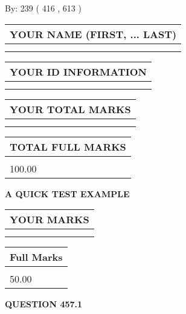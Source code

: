 \documentclass[12pt]{article}
\begin{document}
   
\hspace{1.0in} By: 
 239 ( 416 ,  613 )
   
   
   
   
\newpage 
\setcounter{page}{ 
   457001 } 
   
   
   
   
\noindent\begin{tabular}{|l|}
\hline
YOUR NAME (FIRST, ... LAST)  \\
\hline
 \\ 
 \\ 
\hline
\end{tabular}
\hspace{0.05in} \begin{tabular}{|l|}
\hline
 YOUR   ID   INFORMATION  \\
\hline
 \\ 
 \\ 
\hline
\end{tabular}
   
   
\vspace{0.2in}\noindent\begin{tabular}{|l|}
\hline
YOUR TOTAL MARKS  \\
\hline
 \\ 
 \\ 
\hline
\end{tabular}
\hspace{0.05in} \begin{tabular}{|l|}
\hline
TOTAL FULL MARKS  \\
\hline
 \\ 
100.00 \\
\hline
\end{tabular}
   
   
 \vspace{0.2in}
{\LARGE {\textbf{ A QUICK TEST EXAMPLE}}}
   
   
  
\vspace{0.2in}
  
\noindent\begin{tabular}{|l|}
\hline
 YOUR MARKS  \\
\hline
 \\ 
 \\ 
\hline
\end{tabular}
\hspace{0.05in} \begin{tabular}{|l|}
\hline
 Full Marks  \\
\hline
 \\ 
50.00 \\
\hline
\end{tabular}
{\textbf{\Large{QUESTION
457.1 
}}}
  
\end{document}

